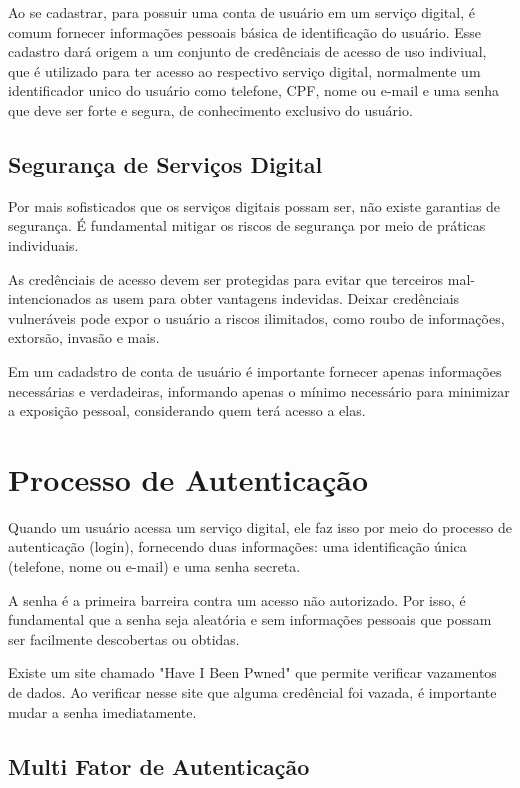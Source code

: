 \documentclass[12pt]{article}
\begin{document}
Ao se cadastrar, para possuir uma conta de usuário em um serviço digital,
é comum fornecer informações pessoais básica de identificação do usuário.
Esse cadastro dará origem a um conjunto de credênciais de acesso de uso
indiviual, que é utilizado para ter acesso ao respectivo serviço digital,
normalmente um identificador unico do usuário como telefone, CPF, nome ou
e-mail e uma senha que deve ser forte e segura, de conhecimento exclusivo
do usuário.

\subsection{Segurança de Serviços Digital}

Por mais sofisticados que os serviços digitais possam ser, não existe
garantias de segurança. É fundamental mitigar os riscos de segurança
por meio de práticas individuais.

As credênciais de acesso devem ser protegidas para evitar que terceiros
mal-intencionados as usem para obter vantagens indevidas.
Deixar credênciais vulneráveis pode expor o usuário a riscos ilimitados,
como roubo de informações, extorsão, invasão e mais.

Em um cadadstro de conta de usuário é importante fornecer apenas informações
necessárias e verdadeiras, informando apenas o mínimo necessário para
minimizar a exposição pessoal, considerando quem terá acesso a elas.

\section{Processo de Autenticação}

Quando um usuário acessa um serviço digital, ele faz isso por meio do
processo de autenticação (login), fornecendo duas informações: uma
identificação única (telefone, nome ou e-mail) e uma senha secreta.

A senha é a primeira barreira contra um acesso não autorizado.
Por isso, é fundamental que a senha seja aleatória e sem informações
pessoais que possam ser facilmente descobertas ou obtidas.

Existe um site chamado "Have I Been Pwned" \cite{hibp} que permite verificar
vazamentos de dados.
Ao verificar nesse site que alguma credêncial foi vazada, é importante mudar
a senha imediatamente.

\subsection{Multi Fator de Autenticação}
\end{document}
